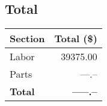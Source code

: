 \subsection{Total}
\begin{center}
\begin{tabular}{|l|r|}
\hline
\multicolumn{1}{|c}{Section} & \multicolumn{1}{|c|}{Total (\$)} \\
\hline\hline
Labor       & 39375.00 \\
\hline
Parts       & ---.--   \\
\hline
{\bf Total} & {\bf -----.--} \\
\hline
\end{tabular}
\end{center}
